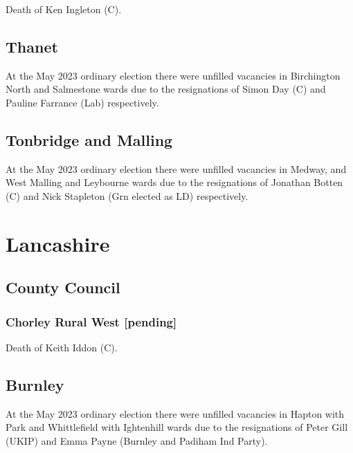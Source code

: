\documentclass[a4paper,openany]{book}
\begin{document}
\begin{resultsiii}
Death of Ken Ingleton (C).

\subsection*{Thanet}

At the May 2023 ordinary election there were unfilled vacancies in Birchington North and Salmestone wards due to the resignations of Simon Day (C) and Pauline Farrance (Lab) respectively.%
%
%

\subsection*{Tonbridge and Malling}

At the May 2023 ordinary election there were unfilled vacancies in Medway, and West Malling and Leybourne wards due to the resignations of Jonathan Botten (C) and Nick Stapleton (Grn elected as LD) respectively.%
%

\section{Lancashire}

\subsection*{County Council}

\subsubsection*{Chorley Rural West \hspace*{\fill}\nolinebreak[1]%
	\enspace\hspace*{\fill}
	[pending]}


Death of Keith Iddon (C).

\subsection*{Burnley}

At the May 2023 ordinary election there were unfilled vacancies in Hapton with Park and Whittlefield with Ightenhill wards due to the resignations of Peter Gill (UKIP) and Emma Payne (Burnley and Padiham Ind Party).%
%


\end{resultsiii}
\end{document}
